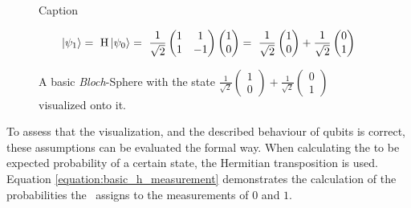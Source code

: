 \begin{figure}[!h]
    \centering{}
    \caption{Caption}
    \label{figure:h_circuit}
\end{figure}

\begin{equation}
    \centering
    \begin{split}
        \ket{\psi_1} =\ \mathrm{H}\ket{\psi_0} =\ \frac{1}{\sqrt{2}}\begin{pmatrix} 1 & 1 \\ 1 & -1 \end{pmatrix}\begin{pmatrix}1 \\ 0\end{pmatrix} =\ \frac{1}{\sqrt{2}}\begin{pmatrix}1 \\ 0 \end{pmatrix} + \frac{1}{\sqrt{2}}\begin{pmatrix}0 \\ 1 \end{pmatrix}\\
    \end{split}
    \label{equation:equal_superposition_equation}
\end{equation}

\begin{figure}[!h]
    \centering
    \scalebox{\blochwidth}{
        
    }
    \caption{A basic \emph{Bloch}-Sphere with the state $\frac{1}{\sqrt{2}}\begin{pmatrix}1 \\ 0 \end{pmatrix} + \frac{1}{\sqrt{2}}\begin{pmatrix}0 \\ 1 \end{pmatrix}$ visualized onto it.}
    \label{figure:state_0_bloch_sphere}
\end{figure}

To assess that the visualization, and the described behaviour of qubits is correct, these assumptions can be evaluated the formal way. When calculating the to be expected probability of a certain state, the Hermitian transposition\cite{marshall_c_methods_1964} is used. Equation \ref{equation:basic_h_measurement} demonstrates the calculation of the probabilities the \hgate\ assigns to the measurements of $0$ and $1$.

